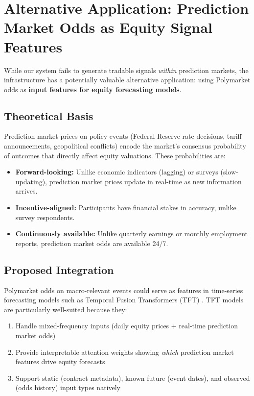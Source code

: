 \documentclass[12pt, letterpaper]{article}
\begin{document}
\section{Alternative Application: Prediction Market Odds as Equity Signal Features}
\label{sec:future}

While our system fails to generate tradable signals \textit{within} prediction markets, the infrastructure has a potentially valuable alternative application: using Polymarket odds as \textbf{input features for equity forecasting models}.

\subsection{Theoretical Basis}

Prediction market prices on policy events (Federal Reserve rate decisions, tariff announcements, geopolitical conflicts) encode the market's consensus probability of outcomes that directly affect equity valuations. These probabilities are:

\begin{itemize}
    \item \textbf{Forward-looking:} Unlike economic indicators (lagging) or surveys (slow-updating), prediction market prices update in real-time as new information arrives.
    \item \textbf{Incentive-aligned:} Participants have financial stakes in accuracy, unlike survey respondents.
    \item \textbf{Continuously available:} Unlike quarterly earnings or monthly employment reports, prediction market odds are available 24/7.
\end{itemize}

\subsection{Proposed Integration}

Polymarket odds on macro-relevant events could serve as features in time-series forecasting models such as Temporal Fusion Transformers (TFT) \citep{lim2021temporal}. TFT models are particularly well-suited because they:

\begin{enumerate}
    \item Handle mixed-frequency inputs (daily equity prices + real-time prediction market odds)
    \item Provide interpretable attention weights showing \textit{which} prediction market features drive equity forecasts
    \item Support static (contract metadata), known future (event dates), and observed (odds history) input types natively
\end{enumerate}
\end{document}

